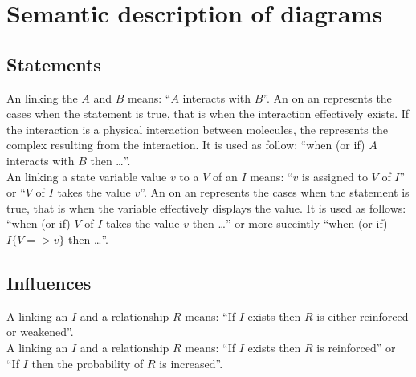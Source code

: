 \color{red}
\section{Semantic description of \ER{} diagrams}


\subsection{Statements}

An  linking the  $A$ and $B$ means: ``$A$ interacts with $B$''. An  on an  represents the cases when the statement is true, that is when the interaction effectively exists. If the interaction is a physical interaction between molecules, the  represents the complex resulting from the interaction. It is used as follow: ``when (or if) $A$ interacts with $B$ then \ldots''.\\[\baselineskip]

\noindent
An  linking a state variable value $v$ to a  $V$ of an  $I$ means: ``$v$ is assigned to $V$ of $I$'' or ``$V$ of $I$ takes the value $v$''. An on an  represents the cases when the statement is true, that is when the variable effectively displays the value. It is used as follows: ``when (or if) $V$ of $I$ takes the value $v$ then \ldots'' or more succintly ``when (or if) $I\{V => v\}$ then \ldots''.\\[\baselineskip]

\subsection{Influences}

A  linking an  $I$ and a relationship $R$ means: ``If $I$ exists then $R$ is either reinforced or weakened''. 
\\[\baselineskip]

\noindent
A  linking an  $I$ and a relationship $R$ means: ``If $I$ exists then $R$ is reinforced'' or ``If $I$ then the probability of $R$ is increased''. 
\\[\baselineskip]

